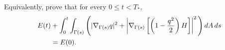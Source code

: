 \documentclass[10pt,a4paper]{article}
\theoremstyle{definition}
\begin{document}
\begin{enumerate}
  Equivalently, prove that for every $0\leq t<T_*$,
  \begin{align}
    E(t)
    &+
    \int_0^t\int_{\Gamma(s)}
    \Bigg(
      |\nabla_{\Gamma(s)}q|^2
      +
      \left|
        \nabla_{\Gamma(s)}
        \left[\left(1-\frac{q^2}{2}\right)H\right]
      \right|^2
    \Bigg)
    \,dA\,ds
    \notag\\
    &=E(0).
  \end{align}
\end{enumerate}
\end{document}
